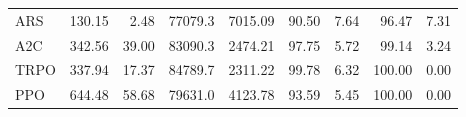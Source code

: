 \begin{samepage}
\begin{center}
\begin{tabular}{l|rr|rr|rr|rr}
    ARS          &   130.15 &     2.48 &    77079.3 &    7015.09 &   90.50 &    7.64 &   96.47 &    7.31 \\
    A2C          &   342.56 &    39.00 &    83090.3 &    2474.21 &   97.75 &    5.72 &   99.14 &    3.24 \\
    TRPO         &   337.94 &    17.37 &    84789.7 &    2311.22 &   99.78 &    6.32 &  100.00 &    0.00 \\
    PPO          &   644.48 &    58.68 &    79631.0 &    4123.78 &   93.59 &    5.45 &  100.00 &    0.00 \\
    \bottomrule
  \end{tabular}
\end{center}
\end{samepage}

